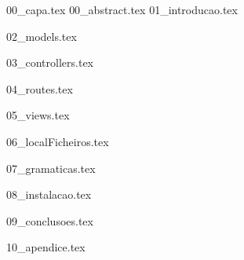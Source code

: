 \documentclass{article}
\begin{document}
{00_capa.tex} \newpage
{00_abstract.tex} \tableofcontents \newpage 
{01_introducao.tex}

{02_models.tex}

{03_controllers.tex}

{04_routes.tex}

{05_views.tex}

{06_localFicheiros.tex}

{07_gramaticas.tex}

{08_instalacao.tex}

{09_conclusoes.tex}

\printbibliography

\appendix
{10_apendice.tex}
\end{document}
